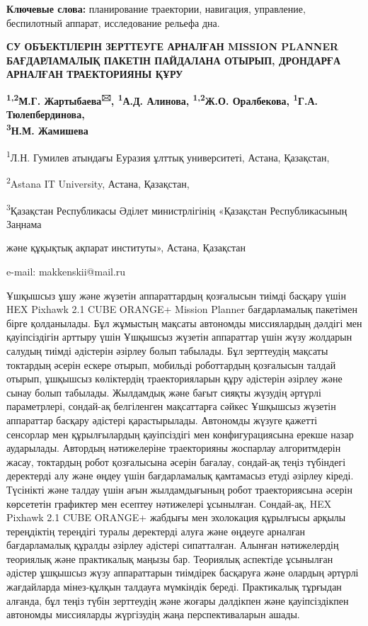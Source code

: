 {\bfseries Ключевые слова:} планирование траектории, навигация, управление,
беспилотный аппарат, исследование рельефа дна.
\begin{center}

{\bfseries СУ ОБЪЕКТІЛЕРІН ЗЕРТТЕУГЕ АРНАЛҒАН MISSION PLANNER БАҒДАРЛАМАЛЫҚ ПАКЕТІН ПАЙДАЛАНА ОТЫРЫП, ДРОНДАРҒА АРНАЛҒАН ТРАЕКТОРИЯНЫ ҚҰРУ}

{\bfseries \textsuperscript{1,2}М.Г. Жартыбаева\textsuperscript{🖂},
\textsuperscript{1}А.Д. Алинова, \textsuperscript{1,2}Ж.О. Оралбекова,
\textsuperscript{1}Г.А. Тюлепбердинова,\\
\textsuperscript{3}Н.М. Жамишева}

\textsuperscript{1}Л.Н. Гумилев атындағы Еуразия ұлттық университеті,
Астана, Қазақстан,

\textsuperscript{2}Astana IT University, Астана, Қазақстан,

\textsuperscript{3}Қазақстан Республикасы Әділет министрлігінің
«Қазақстан Республикасының Заңнама

және құқықтық ақпарат институты», Астана, Қазақстан

e-mail: makkenskii@mail.ru
\end{center}

Ұшқышсыз ұшу және жүзетін аппараттардың қозғалысын тиімді басқару үшін
HEX Pixhawk 2.1 CUBE ORANGE+ Mission Planner бағдарламалық пакетімен
бірге қолданылады. Бұл жұмыстың мақсаты автономды миссиялардың дәлдігі
мен қауіпсіздігін арттыру үшін Ұшқышсыз жүзетін аппараттар үшін жүзу
жолдарын салудың тиімді әдістерін әзірлеу болып табылады. Бұл зерттеудің
мақсаты токтардың әсерін ескере отырып, мобильді роботтардың қозғалысын
талдай отырып, ұшқышсыз көліктердің траекторияларын құру әдістерін
әзірлеу және сынау болып табылады. Жылдамдық және бағыт сияқты жүзудің
әртүрлі параметрлері, сондай-ақ белгіленген мақсаттарға сәйкес Ұшқышсыз
жүзетін аппараттар басқару әдістері қарастырылады. Автономды жүзуге
қажетті сенсорлар мен құрылғылардың қауіпсіздігі мен конфигурациясына
ерекше назар аударылады. Автордың нәтижелеріне траекторияны жоспарлау
алгоритмдерін жасау, токтардың робот қозғалысына әсерін бағалау,
сондай-ақ теңіз түбіндегі деректерді алу және өңдеу үшін бағдарламалық
қамтамасыз етуді әзірлеу кіреді. Түсінікті және талдау үшін ағын
жылдамдығының робот траекториясына әсерін көрсететін графиктер мен
есептеу нәтижелері ұсынылған. Сондай-ақ, HEX Pixhawk 2.1 CUBE ORANGE+
жабдығы мен эхолокация құрылғысы арқылы тереңдіктің тереңдігі туралы
деректерді алуға және өңдеуге арналған бағдарламалық құралды әзірлеу
әдістері сипатталған. Алынған нәтижелердің теориялық және практикалық
маңызы бар. Теориялық аспектіде ұсынылған әдістер ұшқышсыз жүзу
аппараттарын тиімдірек басқаруға және олардың әртүрлі жағдайларда
мінез-құлқын талдауға мүмкіндік береді. Практикалық тұрғыдан алғанда,
бұл теңіз түбін зерттеудің және жоғары дәлдікпен және қауіпсіздікпен
автономды миссияларды жүргізудің жаңа перспективаларын ашады.

